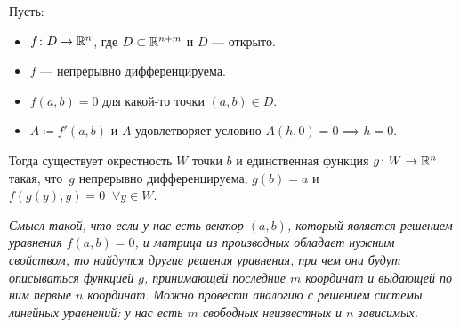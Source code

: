 \begin{theorem} 
    Пусть:
    \begin{itemize}
      \item $f \colon D \to \mathbb{R}^n$, где $D \subset \mathbb{R}^{n + m}$ и $D$ --- открыто.
      \item $f$ --- непрерывно дифференцируема.
      \item $f(a, b) = 0$ для какой-то точки $(a, b) \in D$.
      \item $A \coloneqq f'(a, b)$ и $A$ удовлетворяет условию $A(h, 0) = 0 \implies h = 0$.
    \end{itemize}
    Тогда существует окрестность $W$ точки $b$ и единственная функция $g\colon W \to \mathbb{R}^n$ такая, что~$g$ непрерывно дифференцируема, $g(b) = a$ и $f(g(y), y) = 0\;\; \forall y \in W$.

    \textit{Смысл такой, что если у нас есть вектор $(a, b)$, который является решением уравнения $f(a, b) = 0$, и матрица из производных обладает нужным свойством, то найдутся другие решения уравнения, 
    при чем они будут описываться функцией $g$, принимающей последние $m$ координат и выдающей по ним первые $n$ координат. Можно провести аналогию с решением системы линейных уравнений: 
    у нас есть $m$ свободных неизвестных и $n$ зависимых.}
\end{theorem}

